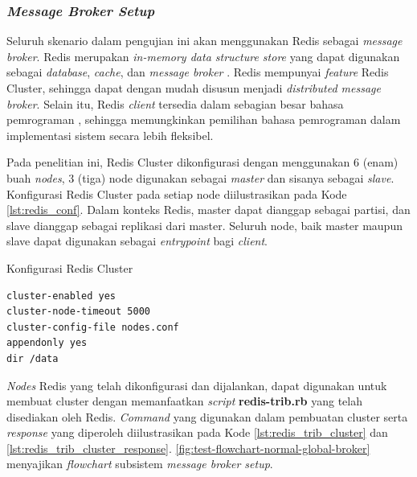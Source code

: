\subsubsection{\textit{Message Broker Setup}}
\label{ssec:broker-setup}
Seluruh skenario dalam pengujian ini akan menggunakan Redis sebagai \textit{message broker}. Redis merupakan \textit{in-memory data structure store} yang dapat digunakan sebagai \textit{database}, \textit{cache}, dan \textit{message broker} \citep{redis_introduction_2017}. Redis mempunyai \textit{feature} Redis Cluster, sehingga dapat dengan mudah disusun menjadi \textit{distributed message broker}. Selain itu, Redis \textit{client} tersedia dalam sebagian besar bahasa pemrograman \citep{redis_clients_2017}, sehingga memungkinkan pemilihan bahasa pemrograman dalam implementasi sistem secara lebih fleksibel.


Pada penelitian ini, Redis Cluster dikonfigurasi dengan menggunakan 6 (enam) buah \textit{nodes}, 3 (tiga) node digunakan sebagai \textit{master} dan sisanya sebagai \textit{slave}. Konfigurasi Redis Cluster pada setiap node diilustrasikan pada Kode \autoref{lst:redis_conf}. Dalam konteks Redis, master dapat dianggap sebagai partisi, dan slave dianggap sebagai replikasi dari master. Seluruh node, baik master maupun slave dapat digunakan sebagai \textit{entrypoint} bagi \textit{client}.


\begin{listing}[!]
	\captionsetup{format=hang}
	\caption{Konfigurasi Redis Cluster}
	\label{lst:redis_conf}
	\begin{verbatim}
cluster-enabled yes
cluster-node-timeout 5000
cluster-config-file nodes.conf
appendonly yes
dir /data
	\end{verbatim}
\end{listing}


\textit{Nodes} Redis yang telah dikonfigurasi dan dijalankan, dapat digunakan untuk membuat cluster dengan memanfaatkan  \textit{script} \textbf{redis-trib.rb} yang telah disediakan oleh Redis. \textit{Command} yang digunakan dalam pembuatan cluster serta  \textit{response} yang diperoleh diilustrasikan pada Kode \autoref{lst:redis_trib_cluster} dan \autoref{lst:redis_trib_cluster_response}. \autoref{fig:test-flowchart-normal-global-broker} 
menyajikan \textit{flowchart} subsistem \textit{message broker setup}. 


